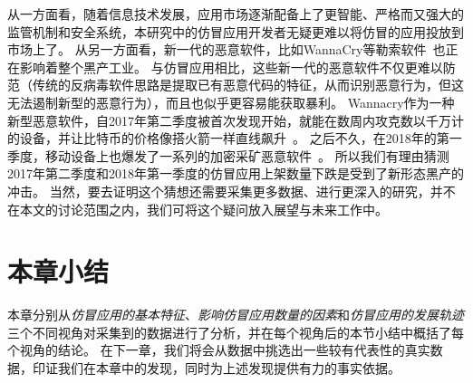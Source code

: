 从一方面看，随着信息技术发展，应用市场逐渐配备上了更智能、严格而又强大的监管机制和安全系统，本研究中的仿冒应用开发者无疑更难以将仿冒的应用投放到市场上了。
从另一方面看，新一代的恶意软件，比如WannaCry等勒索软件~\cite{ransomware}也正在影响着整个黑产工业。
与仿冒应用相比，这些新一代的恶意软件不仅更难以防范（传统的反病毒软件思路是提取已有恶意代码的特征，从而识别恶意行为，但这无法遏制新型的恶意行为），而且也似乎更容易能获取暴利。
Wannacry作为一种新型恶意软件，自2017年第二季度被首次发现开始，就能在数周内攻克数以千万计的设备，并让比特币的价格像搭火箭一样直线飙升~\cite{wannacry_bitcoin_news}。
之后不久，在2018年的第一季度，移动设备上也爆发了一系列的加密采矿恶意软件~\cite{comodo_report}。
所以我们有理由猜测2017年第二季度和2018年第一季度的仿冒应用上架数量下跌是受到了新形态黑产的冲击。
当然，要去证明这个猜想还需要采集更多数据、进行更深入的研究，并不在本文的讨论范围之内，我们可将这个疑问放入展望与未来工作中。

\vspace{5mm}
\noindent{}

\section{本章小结}
本章分别从\emph{仿冒应用的基本特征}、\emph{影响仿冒应用数量的因素}和\emph{仿冒应用的发展轨迹}三个不同视角对采集到的数据进行了分析，并在每个视角后的本节小结中概括了每个视角的结论。
在下一章，我们将会从数据中挑选出一些较有代表性的真实数据，印证我们在本章中的发现，同时为上述发现提供有力的事实依据。
